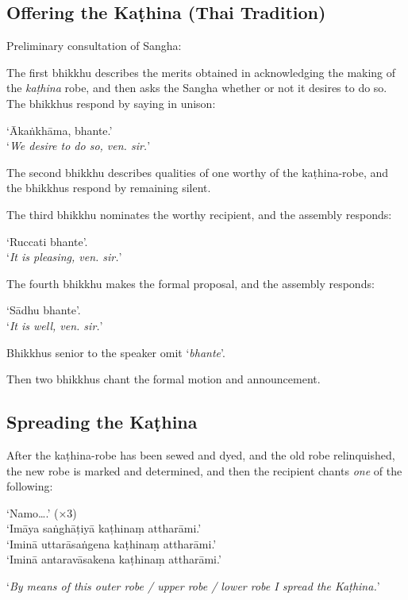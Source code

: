 \subsection{Offering the Kaṭhina (Thai Tradition)}

Preliminary consultation of Sangha:

The first bhikkhu describes the merits obtained in acknowledging the making of
the \emph{kaṭhina} robe, and then asks the Sangha whether or not it desires to
do so. The bhikkhus respond by saying in unison:

‘Ākaṅkhāma, bhante.’\\
‘\emph{We desire to do so, ven. sir.}’

The second bhikkhu describes qualities of one worthy of the kaṭhina-robe, and
the bhikkhus respond by remaining silent.

The third bhikkhu nominates the worthy recipient, and the assembly responds:

‘Ruccati bhante’.\\
‘\emph{It is pleasing, ven. sir.}’

The fourth bhikkhu makes the formal proposal, and the assembly responds:

‘Sādhu bhante’.\\
‘\emph{It is well, ven. sir.}’

Bhikkhus senior to the speaker omit ‘\emph{bhante}’.

Then two bhikkhus chant the formal motion and announcement.


\subsection{Spreading the Kaṭhina}

After the kaṭhina-robe has been sewed and dyed, and the old robe relinquished,
the new robe is marked and determined, and then the recipient chants \emph{one}
of the following:

‘Namo….’ (×3)\\
‘Imāya saṅghāṭiyā kaṭhinaṃ attharāmi.’\\
‘Iminā uttarāsaṅgena kaṭhinaṃ attharāmi.’\\
‘Iminā antaravāsakena kaṭhinaṃ attharāmi.’

‘\emph{By means of this outer robe / upper robe / lower robe I spread the Kaṭhina.}’


